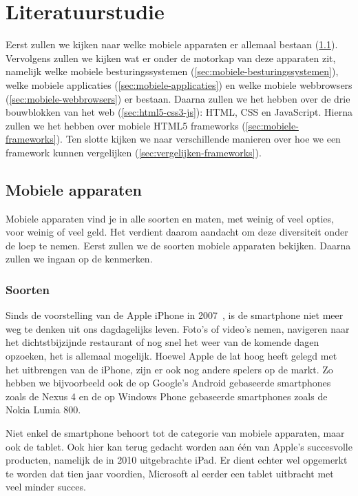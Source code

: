 \chapter{Literatuurstudie}
\label{hoofdstuk:2}
Eerst zullen we kijken naar welke mobiele apparaten er allemaal bestaan (\ref{sec:mobiele-apparaten}). Vervolgens zullen we kijken wat er onder de motorkap van deze apparaten zit, namelijk welke mobiele besturingssystemen (\ref{sec:mobiele-besturingssystemen}), welke mobiele applicaties (\ref{sec:mobiele-applicaties}) en welke mobiele webbrowsers (\ref{sec:mobiele-webbrowsers}) er bestaan. Daarna zullen we het hebben over de drie bouwblokken van het web (\ref{sec:html5-css3-js}):  HTML,  CSS en JavaScript. Hierna zullen we het hebben over mobiele HTML5 frameworks (\ref{sec:mobiele-frameworks}).  Ten slotte kijken we naar verschillende manieren over hoe we een framework kunnen vergelijken (\ref{sec:vergelijken-frameworks}).


\section{Mobiele apparaten}
\label{sec:mobiele-apparaten}
Mobiele apparaten vind je in alle soorten en maten, met weinig of veel opties, voor weinig of veel geld. Het verdient daarom aandacht om deze diversiteit onder de loep te nemen. Eerst zullen we de soorten mobiele apparaten bekijken. Daarna zullen we ingaan op de kenmerken.

\subsection{Soorten}
Sinds de voorstelling van de Apple iPhone in 2007~\cite{David2011}, is de smartphone niet meer weg te denken uit ons dagdagelijks leven. Foto's of video's nemen, navigeren naar het dichtstbijzijnde restaurant of nog snel het weer van de komende dagen opzoeken, het is allemaal mogelijk. Hoewel Apple de lat hoog heeft gelegd met het uitbrengen van de iPhone, zijn er ook nog andere spelers op de markt. Zo hebben we bijvoorbeeld ook de op Google's Android gebaseerde smartphones zoals de Nexus 4 en de op Windows Phone gebaseerde smartphones zoals de Nokia Lumia 800.

Niet enkel de smartphone behoort tot de categorie van mobiele apparaten, maar ook de tablet. Ook hier kan terug gedacht worden aan één van Apple's succesvolle producten, namelijk de in 2010 uitgebrachte iPad. Er dient echter wel opgemerkt te worden dat tien jaar voordien, Microsoft al eerder een tablet uitbracht met veel minder succes.

